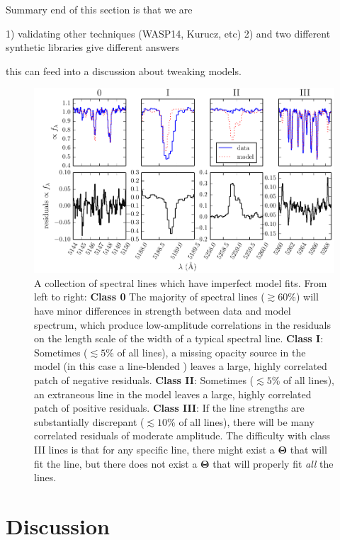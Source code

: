 \documentclass[iop,floatfix]{emulateapj}
\newcommand{\vT}{ {\bm \Theta}}
\begin{document}
Summary end of this section is that we are

1) validating other techniques (WASP14, Kurucz, etc)
2) and two different synthetic libraries give different answers

this can feed into a discussion about tweaking models.

\begin{figure}[!htb]
\begin{center}
  \includegraphics{figs/badlines.pdf}
  \caption{A collection of spectral lines which have imperfect model fits.
    From left to right: \textbf{Class 0} The majority of spectral lines
    ($\gtrsim 60$\%) will have minor differences in strength between data and
    model spectrum, which produce low-amplitude correlations in the residuals
    on the length scale of the width of a typical spectral line.  \textbf{Class
    I}: Sometimes ($\lesssim 5$\% of all lines), a missing opacity source in
    the model (in this case a line-blended ) leaves a large, highly correlated
    patch of negative residuals.  \textbf{Class II}: Sometimes ($\lesssim 5$\%
    of all lines), an extraneous line in the model leaves a large, highly
    correlated patch of positive residuals.  \textbf{Class III}: If the line strengths are
    substantially discrepant ($\lesssim 10$\% of all lines), there will be many
    correlated residuals of moderate amplitude.  The difficulty
    with class III lines is that for any specific line, there might exist a
    $\vT$ that will fit the line, but there does not exist a $\vT$ that
    will properly fit \emph{all} the lines.}
\label{fig:badlines}
\end{center}
\end{figure}

\section{Discussion}
\label{sec:discussion}
\end{document}

